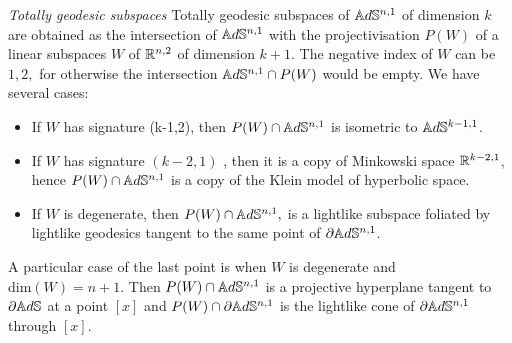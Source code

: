 \noindent\textit{Totally geodesic subspaces} Totally geodesic subspaces of $\mathbb{A}d\mathbb{S}^{n,1}$ of dimension $k$ are obtained as the intersection of $\mathbb{A}d\mathbb{S}^{n,1}$ with the projectivisation $P(W)$ of a linear subspaces $W$ of $\mathbb{R}^{n,2}$ of dimension $k+1.$ The negative index of $W$ can be $1, 2,$ for otherwise the intersection $\mathbb{A}d\mathbb{S}^{n,1}\cap P(W)$ would be empty. We have several cases: 
\begin{itemize}
    \item If $W$ has signature (k-1,2), then $P(W)\cap \mathbb{A}d\mathbb{S}^{n,1}$ is isometric to $\mathbb{A}d\mathbb{S}^{k-1,1}$. 
    \item If $W$ has signature $(k-2, 1)$ , then it is a copy of Minkowski space $\mathbb{R}^{k-2,1}$, hence $P(W)\cap \mathbb{A}d\mathbb{S}^{n,1}$ is a copy of the Klein model of hyperbolic space. 
    \item If $W$ is degenerate, then $P(W)\cap \mathbb{A}d\mathbb{S}^{n,1},$ is a lightlike subspace foliated by lightlike geodesics tangent to the same point of $\partial\mathbb{A}d\mathbb{S}^{n,1}$. 
\end{itemize}  

A particular case of the last point is when $W$ is degenerate and $\text{dim}(W)=n+1.$ Then $P(W)\cap \mathbb{A}d\mathbb{S}^{n,1}$ is a projective hyperplane tangent to $\partial\mathbb{A}d\mathbb{S}$ at a point $[x]$ and $P(W)\cap \partial\mathbb{A}d\mathbb{S}^{n,1}$ is the lightlike cone of $\partial\mathbb{A}d\mathbb{S}^{n,1}$ through $[x]$.  

